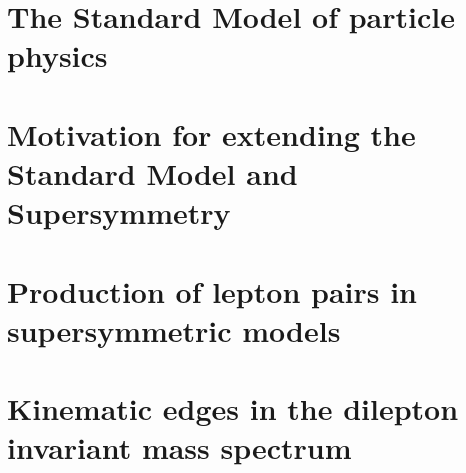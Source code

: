 \section{The Standard Model of particle physics}
\section{Motivation for extending the Standard Model and Supersymmetry}
\section{Production of lepton pairs in supersymmetric models}
\section{Kinematic edges in the dilepton invariant mass spectrum}
